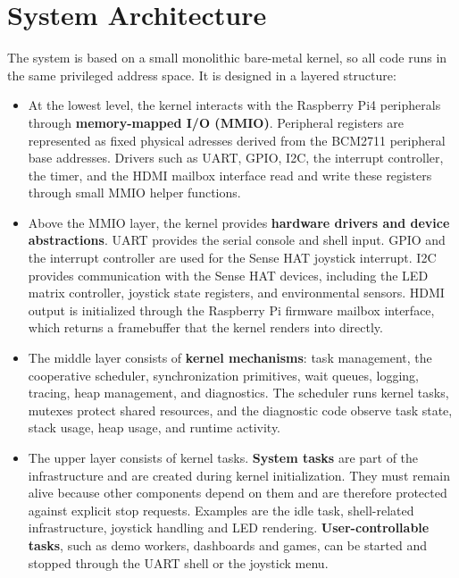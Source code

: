 \section{System Architecture}

The system is based on a small monolithic bare-metal kernel, so all code runs in the same privileged address space. It is designed in a layered structure:

\begin{itemize}
	\item	At the lowest level, the kernel interacts with the Raspberry Pi4 peripherals through \textbf{memory-mapped I/O (MMIO)}. Peripheral registers are represented as fixed physical adresses derived from the BCM2711 peripheral base addresses\cite{bcm2711peripherals}. Drivers such as UART, GPIO, I2C, the interrupt controller, the timer, and the HDMI mailbox interface read and write these registers through small MMIO helper functions.
	\item Above the MMIO layer, the kernel provides \textbf{hardware drivers and device abstractions}. UART provides the serial console and shell input. GPIO and the interrupt controller are used for the Sense HAT joystick interrupt. I2C provides communication with the Sense HAT devices, including the LED matrix controller, joystick state registers, and environmental sensors. HDMI output is initialized through the Raspberry Pi firmware mailbox interface, which returns a framebuffer that the kernel renders into directly.
	\item The middle layer consists of \textbf{kernel mechanisms}: task management, the cooperative scheduler, synchronization primitives, wait queues, logging, tracing, heap management, and diagnostics. The scheduler runs kernel tasks, mutexes protect shared resources, and the diagnostic code observe task state, stack usage, heap usage, and runtime activity.
	\item The upper layer consists of kernel tasks. \textbf{System tasks} are part of the infrastructure and are created during kernel initialization. They must remain alive because other components depend on them and are therefore protected against explicit stop requests. Examples are the idle task, shell-related infrastructure, joystick handling and LED rendering. \textbf{User-controllable tasks}, such as demo workers, dashboards and games, can be started and stopped through the UART shell or the joystick menu.
\end{itemize} 